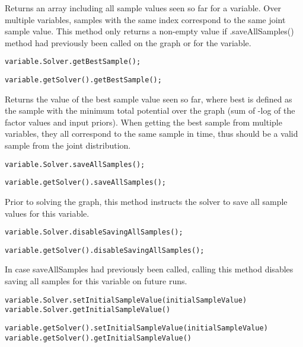 Returns an array including all sample values seen so far for a variable. Over multiple variables, samples with the same index correspond to the same joint sample value. This method only returns a non-empty value if .saveAllSamples() method had previously been called on the graph or for the variable.

\ifmatlab
\begin{lstlisting}
variable.Solver.getBestSample();
\end{lstlisting}
\fi

\ifjava
\begin{lstlisting}
variable.getSolver().getBestSample();
\end{lstlisting}
\fi


Returns the value of the best sample value seen so far, where best is defined as the sample with the minimum total potential over the graph (sum of -log of the factor values and input priors).  When getting the best sample from multiple variables, they all correspond to the same sample in time, thus should be a valid sample from the joint distribution.

\ifmatlab
\begin{lstlisting}
variable.Solver.saveAllSamples();
\end{lstlisting}
\fi

\ifjava
\begin{lstlisting}
variable.getSolver().saveAllSamples();
\end{lstlisting}
\fi

Prior to solving the graph, this method instructs the solver to save all sample values for this variable.

\ifmatlab
\begin{lstlisting}
variable.Solver.disableSavingAllSamples();
\end{lstlisting}
\fi

\ifjava
\begin{lstlisting}
variable.getSolver().disableSavingAllSamples();
\end{lstlisting}
\fi

In case saveAllSamples had previously been called, calling this method disables saving all samples for this variable on future runs.

\ifmatlab
\begin{lstlisting}
variable.Solver.setInitialSampleValue(initialSampleValue)
variable.Solver.getInitialSampleValue()
\end{lstlisting}
\fi

\ifjava
\begin{lstlisting}
variable.getSolver().setInitialSampleValue(initialSampleValue)
variable.getSolver().getInitialSampleValue()
\end{lstlisting}
\fi

